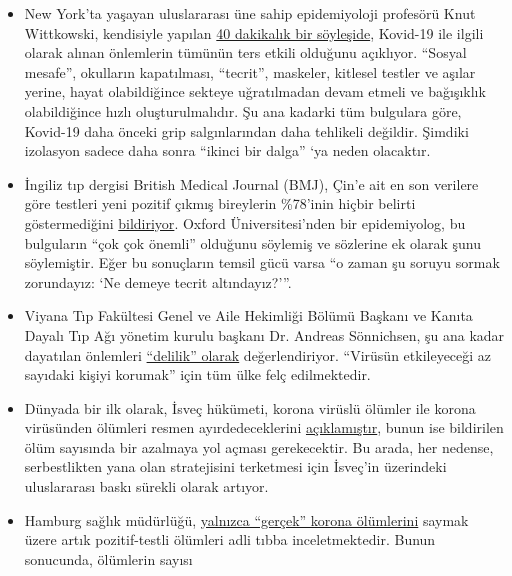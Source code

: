 \begin{itemize}
\tightlist
\item
  New York'ta yaşayan uluslararası üne sahip epidemiyoloji profesörü
  Knut Wittkowski, kendisiyle yapılan
  \href{https://www.youtube.com/watch?v=lGC5sGdz4kg}{40 dakikalık bir
  söyleşide}, Kovid-19 ile ilgili olarak alınan önlemlerin tümünün ters
  etkili olduğunu açıklıyor. ``Sosyal mesafe'', okulların kapatılması,
  ``tecrit'', maskeler, kitlesel testler ve aşılar yerine, hayat
  olabildiğince sekteye uğratılmadan devam etmeli ve bağışıklık
  olabildiğince hızlı oluşturulmalıdır. Şu ana kadarki tüm bulgulara
  göre, Kovid-19 daha önceki grip salgınlarından daha tehlikeli
  değildir. Şimdiki izolasyon sadece daha sonra ``ikinci bir dalga'' `ya
  neden olacaktır.
\item
  İngiliz tıp dergisi British Medical Journal (BMJ), Çin'e ait en son
  verilere göre testleri yeni pozitif çıkmış bireylerin \%78'inin hiçbir
  belirti göstermediğini
  \href{https://www.bmj.com/content/369/bmj.m1375}{bildiriyor}. Oxford
  Üniversitesi'nden bir epidemiyolog, bu bulguların ``çok çok önemli''
  olduğunu söylemiş ve sözlerine ek olarak şunu söylemiştir. Eğer bu
  sonuçların temsil gücü varsa ``o zaman şu soruyu sormak zorundayız:
  `Ne demeye tecrit altındayız?'''.
\item
  Viyana Tıp Fakültesi Genel ve Aile Hekimliği Bölümü Başkanı ve Kanıta
  Dayalı Tıp Ağı yönetim kurulu başkanı Dr. Andreas Sönnichsen, şu ana
  kadar dayatılan önlemleri
  \href{https://www.diepresse.com/5794224/was-machen-wir-da-auf-den-intensivstationen-eigentlich}{``delilik''
  olarak} değerlendiriyor. ``Virüsün etkileyeceği az sayıdaki kişiyi
  korumak'' için tüm ülke felç edilmektedir.
\item
  Dünyada bir ilk olarak, İsveç hükümeti, korona virüslü ölümler ile
  korona virüsünden ölümleri resmen ayırdedeceklerini
  \href{https://www.telegraph.co.uk/news/2020/04/03/coronavirus-swedish-experiment-could-prove-britain-wrong/}{açıklamıştır},
  bunun ise bildirilen ölüm sayısında bir azalmaya yol açması
  gerekecektir. Bu arada, her nedense, serbestlikten yana olan
  stratejisini terketmesi için İsveç'in üzerindeki uluslararası baskı
  sürekli olarak artıyor.
\item
  Hamburg sağlık müdürlüğü,
  \href{https://www.t-online.de/nachrichten/deutschland/id_87636856/coronavirus-hamburg-will-nur-echte-covid-19-tote-zaehlen.html}{yalnızca
  ``gerçek'' korona ölümlerini} saymak üzere artık pozitif-testli
  ölümleri adli tıbba inceletmektedir. Bunun sonucunda, ölümlerin sayısı

\end{itemize}
